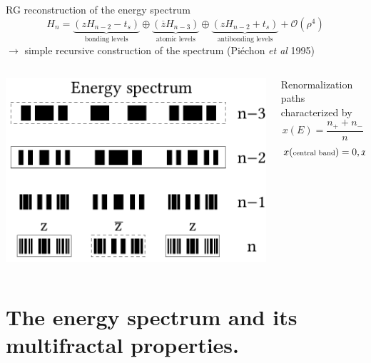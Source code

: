 \documentclass[xcolor=x11names,compress,professionalfonts]{beamer}
\renewcommand{\(}{\begin{columns}}
\renewcommand{\)}{\end{columns}}
\newcommand{\<}[1]{\begin{column}{#1}}
\renewcommand{\>}{\end{column}}
\newcommand{\zb}{\ensuremath{\overline{z}}}
\begin{document}
\begin{frame}{RG reconstruction of the energy spectrum}
 \[ H_n = \underbrace{\left( z H_{n-2} - t_s \right)}_{\text{bonding levels}} \oplus \underbrace{\left( \zb H_{n-3} \right)}_{\text{atomic levels}} \oplus \underbrace{\left( z H_{n-2} + t_s \right)}_{\text{antibonding levels}} + \mathcal{O}(\rho^4)\]
	$\rightarrow$ simple recursive construction of the spectrum (Piéchon \emph{et al} 1995)
	
	\begin{columns}
	\begin{column}{6cm}
	\centering
	\includegraphics[scale=.45]{recursive_construction_spectrum.pdf}
	\end{column}
	\begin{column}{6cm}
	
	Renormalization paths characterized by
	\[ x(E) = \frac{n_+ + n_-}{n} \]
	\[
		x(\text{\scriptsize{central band}}) = 0, x(\text{\scriptsize{edge bands}}) = 1/2
	\]
	\end{column}
	\end{columns}
\end{frame}

\section{The energy spectrum and its multifractal properties.}
\end{document}

